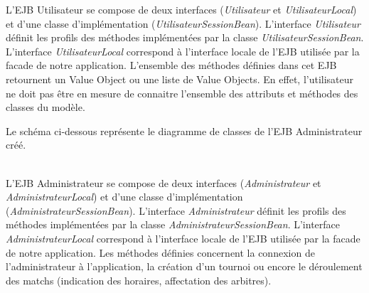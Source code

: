\documentclass[10pt]{report}
\begin{document}
L'EJB Utilisateur se compose de deux interfaces (\textit{Utilisateur} et \textit{UtilisateurLocal}) et d'une classe d'implémentation (\textit{UtilisateurSessionBean}). L'interface \textit{Utilisateur} définit les profils des méthodes implémentées par la classe \textit{UtilisateurSessionBean}. L'interface \textit{UtilisateurLocal} correspond à l'interface locale de l'EJB utilisée par la facade de notre application. L'ensemble des méthodes définies dans cet EJB retournent un Value Object ou une liste de Value Objects. En effet, l'utilisateur ne doit pas être en mesure de connaitre l'ensemble des attributs et méthodes des classes du modèle.

\newpage
Le schéma ci-dessous représente le diagramme de classes de l'EJB Administrateur créé. \\
	\begin{figure}[hp]
	      \begin{center}
	      \end{center}
	\end{figure}
\\

L'EJB Administrateur se compose de deux interfaces (\textit{Administrateur} et \textit{AdministrateurLocal}) et d'une classe d'implémentation (\textit{AdministrateurSessionBean}). L'interface \textit{Administrateur} définit les profils des méthodes implémentées par la classe \textit{AdministrateurSessionBean}. L'interface \textit{AdministrateurLocal} correspond à l'interface locale de l'EJB utilisée par la facade de notre application. Les méthodes définies concernent la connexion de l'administrateur à l'application, la création d'un tournoi ou encore le déroulement des matchs (indication des horaires, affectation des arbitres).
\end{document}
